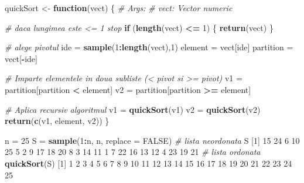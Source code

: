 \documentclass[]{article}
\newenvironment{Shaded}{\begin{snugshade}}{\end{snugshade}}
\newcommand{\CommentTok}[1]{\textcolor[rgb]{0.56,0.35,0.01}{\textit{#1}}}
\newcommand{\ControlFlowTok}[1]{\textcolor[rgb]{0.13,0.29,0.53}{\textbf{#1}}}
\newcommand{\DataTypeTok}[1]{\textcolor[rgb]{0.13,0.29,0.53}{#1}}
\newcommand{\DecValTok}[1]{\textcolor[rgb]{0.00,0.00,0.81}{#1}}
\newcommand{\KeywordTok}[1]{\textcolor[rgb]{0.13,0.29,0.53}{\textbf{#1}}}
\newcommand{\NormalTok}[1]{#1}
\newcommand{\OperatorTok}[1]{\textcolor[rgb]{0.81,0.36,0.00}{\textbf{#1}}}
\newcommand{\OtherTok}[1]{\textcolor[rgb]{0.56,0.35,0.01}{#1}}
\newcommand{\StringTok}[1]{\textcolor[rgb]{0.31,0.60,0.02}{#1}}
\begin{document}
\begin{Shaded}
\begin{Highlighting}[]
\NormalTok{quickSort <-}\StringTok{ }\ControlFlowTok{function}\NormalTok{(vect) \{}
  \CommentTok{# Args:}
  \CommentTok{#  vect: Vector numeric}
  
  \CommentTok{# daca lungimea este <= 1 stop}
  \ControlFlowTok{if}\NormalTok{ (}\KeywordTok{length}\NormalTok{(vect) }\OperatorTok{<=}\StringTok{ }\DecValTok{1}\NormalTok{) \{}
    \KeywordTok{return}\NormalTok{(vect)}
\NormalTok{  \}}
  
  \CommentTok{# alege pivotul}
\NormalTok{  ide =}\StringTok{ }\KeywordTok{sample}\NormalTok{(}\DecValTok{1}\OperatorTok{:}\KeywordTok{length}\NormalTok{(vect),}\DecValTok{1}\NormalTok{)}
\NormalTok{  element =}\StringTok{ }\NormalTok{vect[ide]}
\NormalTok{  partition =}\StringTok{ }\NormalTok{vect[}\OperatorTok{-}\NormalTok{ide]}
  
  \CommentTok{# Imparte elementele in doua subliste (< pivot si >= pivot)}
\NormalTok{  v1 =}\StringTok{ }\NormalTok{partition[partition }\OperatorTok{<}\StringTok{ }\NormalTok{element]}
\NormalTok{  v2 =}\StringTok{ }\NormalTok{partition[partition }\OperatorTok{>=}\StringTok{ }\NormalTok{element]}
  
  \CommentTok{# Aplica recursiv algoritmul}
\NormalTok{  v1 =}\StringTok{ }\KeywordTok{quickSort}\NormalTok{(v1)}
\NormalTok{  v2 =}\StringTok{ }\KeywordTok{quickSort}\NormalTok{(v2)}
  \KeywordTok{return}\NormalTok{(}\KeywordTok{c}\NormalTok{(v1, element, v2))}
\NormalTok{\}}

\NormalTok{n =}\StringTok{ }\DecValTok{25}
\NormalTok{S =}\StringTok{ }\KeywordTok{sample}\NormalTok{(}\DecValTok{1}\OperatorTok{:}\NormalTok{n, n, }\DataTypeTok{replace =} \OtherTok{FALSE}\NormalTok{)}
\CommentTok{# lista neordonata}
\NormalTok{S}
\NormalTok{ [}\DecValTok{1}\NormalTok{] }\DecValTok{15} \DecValTok{24}  \DecValTok{6} \DecValTok{10} \DecValTok{25}  \DecValTok{5}  \DecValTok{2}  \DecValTok{9} \DecValTok{17} \DecValTok{18} \DecValTok{20}  \DecValTok{8}  \DecValTok{3} \DecValTok{14} \DecValTok{11}  \DecValTok{1}  \DecValTok{7} \DecValTok{22} \DecValTok{16} \DecValTok{13} \DecValTok{12}  \DecValTok{4} \DecValTok{23} \DecValTok{19} \DecValTok{21}
\CommentTok{# lista ordonata}
\KeywordTok{quickSort}\NormalTok{(S)}
\NormalTok{ [}\DecValTok{1}\NormalTok{]  }\DecValTok{1}  \DecValTok{2}  \DecValTok{3}  \DecValTok{4}  \DecValTok{5}  \DecValTok{6}  \DecValTok{7}  \DecValTok{8}  \DecValTok{9} \DecValTok{10} \DecValTok{11} \DecValTok{12} \DecValTok{13} \DecValTok{14} \DecValTok{15} \DecValTok{16} \DecValTok{17} \DecValTok{18} \DecValTok{19} \DecValTok{20} \DecValTok{21} \DecValTok{22} \DecValTok{23} \DecValTok{24} \DecValTok{25}
\end{Highlighting}
\end{Shaded}
\end{document}
